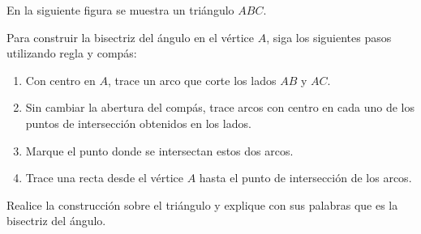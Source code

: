 En la siguiente figura se muestra un triángulo $ABC$.

\begin{center}
\end{center}

Para construir la bisectriz del ángulo en el vértice $A$, siga los siguientes pasos utilizando regla y compás:

\begin{enumerate}
\item Con centro en $A$, trace un arco que corte los lados $AB$ y $AC$.
\item Sin cambiar la abertura del compás, trace arcos con centro en cada uno de los puntos de intersección obtenidos en los lados.
\item Marque el punto donde se intersectan estos dos arcos.
\item Trace una recta desde el vértice $A$ hasta el punto de intersección de los arcos.
\end{enumerate}

Realice la construcción sobre el triángulo y explique con sus palabras que es la bisectriz del ángulo.